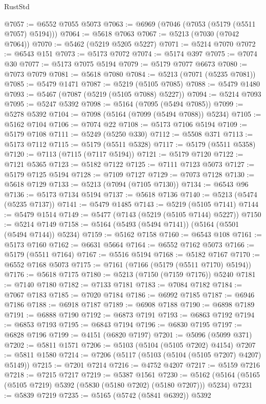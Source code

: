 \begin{lexlean}{RustStd}
\begin{coremodule}
@7057 := @6552 @7055 @5073
@7063 := @6969 (@7046 (@7053 (@5179 (@5511 @7057) @5194)))
@7064 := @5618 @7063
@7067 := @5213 (@7030 (@7042 @7064))
@7070 := @5462 (@5219 @5205 @5227)
@7071 := @5214 @7070
@7072 := @6543 @151
@7073 := @5173 @7072
@7074 := @5174 @397
@7075 := @7074 @30
@7077 := @5173 @7075 @5194
@7079 := @5179 @7077 @6673
@7080 := @7073 @7079
@7081 := @5618 @7080
@7084 := @5213 (@7071 (@5235 @7081))
@7085 := @5479 @1471
@7087 := @5219 (@5105 @7085)
@7088 := @5479 @1480
@7093 := @5467 (@7087 (@5219 (@5105 @7088) @5227))
@7094 := @5214 @7093
@7095 := @5247 @5392
@7098 := @5164 (@7095 (@5494 @7085))
@7099 := @5278 @5392
@7104 := @7098 (@5164 (@7099 (@5494 @7088)) @5234)
@7105 := @5162 @7104
@7106 := @7074 @22
@7108 := @5173 @7106 @5194
@7109 := @5179 @7108
@7111 := @5249 (@5250 @330)
@7112 := @5508 @371
@7113 := @5173 @7112
@7115 := @5179 (@5511 @5328)
@7117 := @5179 (@5511 @5358)
@7120 := @7113 (@7115 (@7117 @5194))
@7121 := @5179 @7120
@7122 := @7121 @5365
@7123 := @5182 @7122
@7125 := @7111 @7123 @5073
@7127 := @5179 @7125 @5194
@7128 := @7109 @7127
@7129 := @7073 @7128
@7130 := @5618 @7129
@7133 := @5213 (@7094 (@7105 @7130))
@7134 := @6543 @96
@7136 := @5173 @7134 @5194
@7137 := @5618 @7136
@7140 := @5213 (@5474 (@5235 @7137))
@7141 := @5479 @1485
@7143 := @5219 (@5105 @7141)
@7144 := @5479 @1514
@7149 := @5477 (@7143 (@5219 (@5105 @7144) @5227))
@7150 := @5214 @7149
@7158 := @5164 (@5493 (@5494 @7141)) (@5164 (@5501 (@5494 @7144)) @5234)
@7159 := @5162 @7158
@7160 := @6543 @108
@7161 := @5173 @7160
@7162 := @6631 @5664
@7164 := @6552 @7162 @5073
@7166 := @5179 (@5511 @7164)
@7167 := @5516 @5194
@7168 := @5182 @7167
@7170 := @6552 @7168 @5073
@7175 := @7161 (@7166 (@5179 (@5511 @7170) @5194))
@7176 := @5618 @7175
@7180 := @5213 (@7150 (@7159 @7176)) @5240
@7181 := @7140 @7180
@7182 := @7133 @7181
@7183 := @7084 @7182
@7184 := @7067 @7183
@7185 := @7020 @7184
@7186 := @6992 @7185
@7187 := @6946 @7186
@7188 := @6918 @7187
@7189 := @6908 @7188
@7190 := @6898 @7189
@7191 := @6888 @7190
@7192 := @6873 @7191
@7193 := @6863 @7192
@7194 := @6853 @7193
@7195 := @6843 @7194
@7196 := @6830 @7195
@7197 := @6828 @7196
@7199 := @4151 (@6820 @7197)
@7201 := @5096 (@5099 @371)
@7202 := @5811 @1571
@7206 := @5103 (@5104 (@5105 @7202) @4154)
@7207 := @5811 @1580
@7214 := @7206 (@5117 (@5103 (@5104 (@5105 @7207) @4207) @5149))
@7215 := @7201 @7214
@7216 := @4752 @4207
@7217 := @5159 @7216
@7218 := @7215 @7217
@7219 := @5387 @1561
@7230 := @5162 (@5164 (@5165 (@5105 @7219) @5392 (@5830 (@5180 @7202) (@5180 @7207))) @5234)
@7231 := @5839 @7219
@7235 := @5165 (@5742 (@5841 @6392)) @5392

\end{coremodule}
\end{lexlean}
